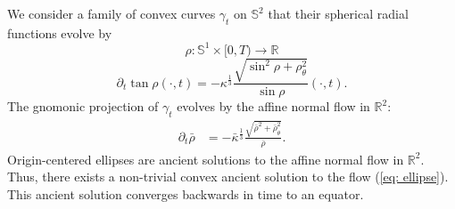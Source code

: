 \documentclass{amsart}
\begin{document}
\begin{example}
We consider a family of convex curves $\gamma_t$ on $\mathbb{S}^2$ that their spherical radial functions evolve by
\[\rho:\mathbb{S}^1\times[0,T)\to \mathbb{R}\]
\begin{equation}\label{eq: ellipse}
\partial_t\tan\rho(\cdot,t)=-\kappa^{\frac{1}{3}} \frac{\sqrt{\sin^2\rho+\rho_{\theta}^2}}{\sin\rho}(\cdot,t).
\end{equation}
The gnomonic projection of $\gamma_t$ evolves by the affine normal flow in $\mathbb{R}^2:$ 
\begin{align*}
\partial_t\bar{\rho}&=-\bar{\kappa}^{\frac{1}{3}}\frac{\sqrt{\bar{\rho}^2+\bar{\rho}_{\theta}^2}}{\bar{\rho}}.
\end{align*}
Origin-centered ellipses are ancient solutions to the affine normal flow in $\mathbb{R}^2$. Thus, there exists a non-trivial convex ancient solution to the flow (\ref{eq: ellipse}). This ancient solution converges backwards in time to an equator. 
\end{example}


\end{document}

